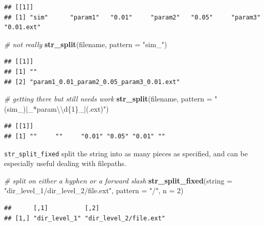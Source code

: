 \documentclass[]{book}
\newenvironment{Shaded}{}{}
\newcommand{\CharTok}[1]{\textcolor[rgb]{0.25,0.44,0.63}{#1}}
\newcommand{\CommentTok}[1]{\textcolor[rgb]{0.38,0.63,0.69}{\textit{#1}}}
\newcommand{\DataTypeTok}[1]{\textcolor[rgb]{0.56,0.13,0.00}{#1}}
\newcommand{\DecValTok}[1]{\textcolor[rgb]{0.25,0.63,0.44}{#1}}
\newcommand{\KeywordTok}[1]{\textcolor[rgb]{0.00,0.44,0.13}{\textbf{#1}}}
\newcommand{\NormalTok}[1]{#1}
\newcommand{\StringTok}[1]{\textcolor[rgb]{0.25,0.44,0.63}{#1}}
\begin{document}
\begin{verbatim}
## [[1]]
## [1] "sim"      "param1"   "0.01"     "param2"   "0.05"     "param3"   "0.01.ext"
\end{verbatim}

\begin{Shaded}
\begin{Highlighting}[]
\CommentTok{# not really}
\KeywordTok{str_split}\NormalTok{(filename,}
          \DataTypeTok{pattern =} \StringTok{"sim_"}\NormalTok{)}
\end{Highlighting}
\end{Shaded}

\begin{verbatim}
## [[1]]
## [1] ""                                       
## [2] "param1_0.01_param2_0.05_param3_0.01.ext"
\end{verbatim}

\begin{Shaded}
\begin{Highlighting}[]
\CommentTok{# getting there but still needs work}
\KeywordTok{str_split}\NormalTok{(filename,}
          \DataTypeTok{pattern =} \StringTok{"(sim_)|_*param}\CharTok{\textbackslash{}\textbackslash{}}\StringTok{d\{1\}_|(.ext)"}\NormalTok{)}
\end{Highlighting}
\end{Shaded}

\begin{verbatim}
## [[1]]
## [1] ""     ""     "0.01" "0.05" "0.01" ""
\end{verbatim}

\texttt{str\_split\_fixed} split the string into as many pieces as specified, and can be especially useful dealing with filepaths.

\begin{Shaded}
\begin{Highlighting}[]
\CommentTok{# split on either a hyphen or a forward slash}
\KeywordTok{str_split_fixed}\NormalTok{(}\DataTypeTok{string =} \StringTok{"dir_level_1/dir_level_2/file.ext"}\NormalTok{,}
                \DataTypeTok{pattern =} \StringTok{"/"}\NormalTok{,}
                \DataTypeTok{n =} \DecValTok{2}\NormalTok{)}
\end{Highlighting}
\end{Shaded}

\begin{verbatim}
##      [,1]          [,2]                  
## [1,] "dir_level_1" "dir_level_2/file.ext"
\end{verbatim}
\end{document}
